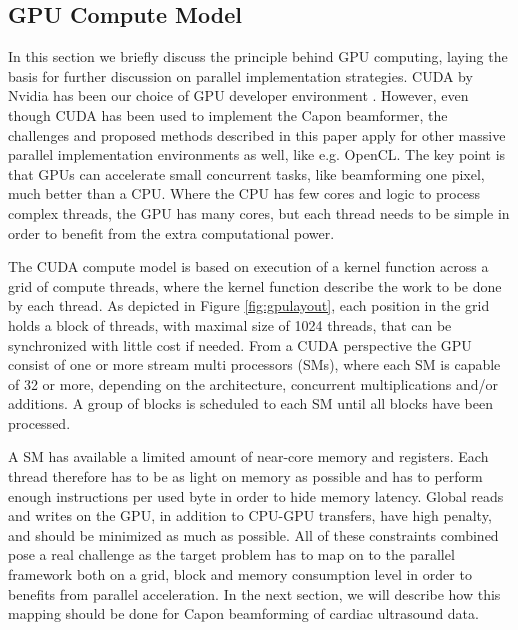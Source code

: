 \documentclass[journal]{IEEEtran}
\begin{document}
\subsection{GPU Compute Model}



In this section we briefly discuss the principle behind GPU computing, laying the basis for further discussion on parallel implementation strategies. CUDA by Nvidia has been our choice of GPU developer environment \cite{Nvidia2011}. However, even though CUDA has been used to implement the Capon beamformer, the challenges and proposed methods described in this paper apply for other massive parallel implementation environments as well, like e.g. OpenCL. The key point is that GPUs can accelerate small concurrent tasks, like beamforming one pixel, much better than a CPU. Where the CPU has few cores and logic to process complex threads, the GPU has many cores, but each thread needs to be simple in order to benefit from the extra computational power. 

The CUDA compute model is based on execution of a kernel function across a grid of compute threads, where the kernel function describe the work to be done by each thread. As depicted in Figure \ref{fig:gpulayout}, each position in the grid holds a block of threads, with maximal size of 1024 threads, that can be synchronized with little cost if needed. 
From a CUDA perspective the GPU consist of one or more stream multi processors (SMs), where each SM is capable of 32 or more, depending on the architecture, concurrent multiplications and/or additions. A group of blocks is scheduled to each SM until all blocks have been processed. 

A SM has available a limited amount of near-core memory and registers. Each thread therefore has to be as light on memory as possible and has to perform enough instructions per used byte in order to hide memory latency. Global reads and writes on the GPU, in addition to CPU-GPU transfers, have high penalty, and should be minimized as much as possible. All of these constraints combined pose a real challenge as the target problem has to map on to the parallel framework both on a grid, block and memory consumption level in order to benefits from parallel acceleration. In the next section, we will describe how this mapping should be done for Capon beamforming of cardiac ultrasound data.    
\end{document}
